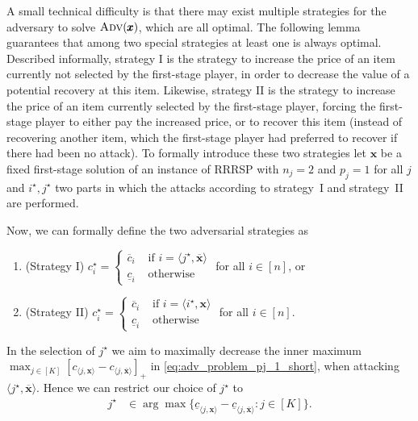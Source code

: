 A small technical difficulty is that there may exist multiple strategies for the adversary to solve $\textsc{Adv}(\pmb{x})$, which are all optimal. The following lemma guarantees that among two special strategies at least one is always optimal. Described informally, strategy I is the strategy to increase the price of an item currently not selected by the first-stage player, in order to decrease the value of a potential recovery at this item. Likewise, strategy II is the strategy to increase the price of an item currently selected by the first-stage player, forcing the first-stage player to either pay the increased price, or to recover this item (instead of recovering another item, which the first-stage player had preferred to recover if there had been no attack).
To formally introduce these two strategies let $\pmb{x}$ be a fixed first-stage solution of an 
instance of RRRSP with $n_j=2$ and $p_j = 1$ for all $j$ and $i^\star, j^\star$ 
two parts in which the attacks according to strategy~I and strategy~II are performed.

Now, we can formally define the two adversarial strategies as
\begin{enumerate}
  \item (Strategy I) $c^\star_i = \begin{cases}
  \overline{c}_i & \text{ if } i = \langle j^\star,\overline{\pmb{x}}\rangle \\
  \underline{c}_i & \text{ otherwise } 
  \end{cases} $ for all $i\in [n]$, or
  
  \item (Strategy II) $c^\star_i = \begin{cases}
  \overline{c}_i & \text{ if } i = \langle i^\star, \pmb{x} \rangle \\
  \underline{c}_i & \text{ otherwise } 
  \end{cases} $ for all $i\in[n]$.
\end{enumerate}

In the selection of $j^\star$ we aim to maximally decrease the inner maximum 
$\max_{j\in[K]} [c_{\langle j, \pmb{x} \rangle} - c_{\langle j, \overline{\pmb{x}} \rangle}]_+$
in \cref{eq:adv_problem_pj_1_short}, when attacking $\langle j^\star,\overline{\pmb{x}}\rangle$.
Hence we can restrict our choice of $j^\star$ to
\begin{align}
  j^\star &\in \arg\max \{ \underline{c}_{\langle j, \pmb{x}\rangle} - \underline{c}_{\langle j, \overline{\pmb{x}} \rangle} : j\in[K] \}. \label{eq:jstar}
\end{align}

